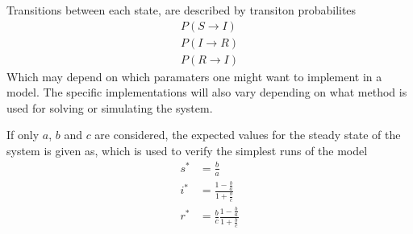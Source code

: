Transitions between each state, are described by transiton probabilites
\begin{eqnarray}
        P (S \rightarrow I) \\
        P (I \rightarrow R) \\
        P (R \rightarrow I) 
\end{eqnarray}
Which may depend on which paramaters one might want to implement in a model.
The specific implementations will also vary depending on what method is used for solving or simulating the system.

If only $a$, $b$ and $c$ are considered, the expected values for the steady state of the system is given as, which is used to verify the simplest runs of the model
\begin{eqnarray}
    s^{*} &=\frac{b}{a} \\
    i^{*} &=\frac{1-\frac{b}{a}}{1+\frac{b}{c}} \\
    r^{*} &=\frac{b}{c} \frac{1-\frac{b}{a}}{1+\frac{b}{c}}
\end{eqnarray}